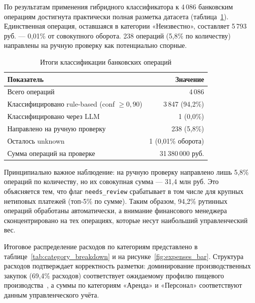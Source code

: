 По результатам применения гибридного классификатора к 4\,086 банковским операциям достигнута практически полная разметка датасета (таблица~\ref{tab:classification_results}). Единственная операция, оставшаяся в категории «Неизвестно», составляет 5\,793 руб. --- 0,01\% от совокупного оборота. 238 операций (5,8\% по количеству) направлены на ручную проверку как потенциально спорные.

\begin{table}[H]
\centering
\caption{Итоги классификации банковских операций}
\label{tab:classification_results}
\begin{tabular}{lr}
\toprule
\textbf{Показатель} & \textbf{Значение} \\
\midrule
Всего операций & 4\,086 \\
Классифицировано rule-based (conf $\geq 0{,}90$) & 3\,847 (94,2\%) \\
Классифицировано через LLM & 1 (0,0\%) \\
Направлено на ручную проверку & 238 (5,8\%) \\
Осталось unknown & 1 (0,01\% оборота) \\
Сумма операций на проверке & 31\,380\,000 руб. \\
\bottomrule
\end{tabular}
\end{table}

Принципиально важное наблюдение: на ручную проверку направлено лишь 5,8\% операций по количеству, но их совокупная сумма --- 31,4 млн руб. Это объясняется тем, что флаг \texttt{needs\_review} срабатывает в том числе для крупных нетиповых платежей (топ-5\% по сумме). Таким образом, 94,2\% рутинных операций обработаны автоматически, а внимание финансового менеджера сконцентрировано на тех операциях, которые несут наибольший управленческий вес.

Итоговое распределение расходов по категориям представлено в таблице~\ref{tab:category_breakdown} и на рисунке~\ref{fig:expenses_bar}. Структура расходов подтверждает корректность разметки: доминирование производственных закупок (69,4\% расходов) соответствует ожидаемому профилю пищевого производства~\cite{sme_profitability_ru}, а суммы по категориям «Аренда» и «Персонал» соответствуют данным управленческого учёта.

